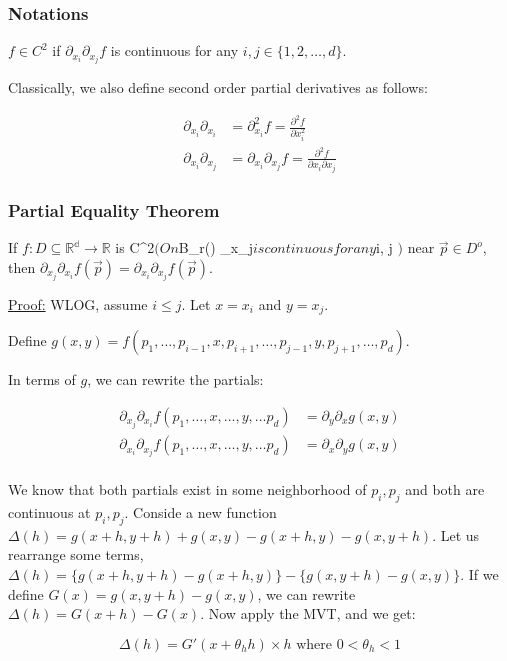 \documentclass[11 pt, twoside]{article}
\begin{document}
\subsubsection{Notations}
$f \in C^2$ if $\partial_{x_i}\partial_{x_j} f$ is continuous for any $i, j \in
\{1, 2, \dots, d\}$.

Classically, we also define second order partial derivatives as follows:

\begin{align*}
\partial_{x_i} \partial_{x_i} &= \partial_{x_i}^2 f = \frac{\partial^2 f}
{\partial x_i^2}\\
\partial_{x_i} \partial_{x_j} &= \partial_{x_i} \partial_{x_j} f =
\frac{\partial^2 f}{\partial x_i \partial x_j}
\end{align*}

\subsubsection{Partial Equality Theorem}
If $f:D \subseteq \mathbb{R^d} \to \mathbb{R}$ is C^2$ (On $B_r() \partial_{x_j}$ is continuous for any $i, j $)$ near $\vec{p} \in D^o$, then $\partial_{x_j}\partial_{x_i} f(\vec{p}) = \partial_{x_i}\partial_{x_j} f(\vec{p})$.

\underline{Proof:}
WLOG, assume $i \leq j$. Let $x = x_i$ and $y = x_j$.

Define $g(x, y) = f(p_1,
\dots, p_{i-1}, x, p_{i+1}, \dots, p_{j-1}, y, p_{j+1}, \dots, p_d)$.

In terms of $g$, we
can rewrite the partials:

\begin{align*}
\partial_{x_j}\partial_{x_i} f(p_1, \dots, x, \dots, y, \dots p_d) &= \partial_y
\partial_x g(x, y)\\
\partial_{x_i}\partial_{x_j} f(p_1, \dots, x, \dots, y, \dots p_d) &= \partial_x
\partial_y g(x, y)\\
\end{align*}

We know that both partials exist in some neighborhood of $p_i, p_j$ and both are
continuous at $p_i, p_j$.
Conside a
new function $\Delta(h) = g(x + h, y + h) + g(x, y) - g(x + h, y) - g(x, y +
h)$. Let us rearrange some terms, $\Delta(h) = \{g(x + h,
y + h) - g(x + h, y)\} - \{g(x, y + h) - g(x, y)\}$. If we define $G(x) = g(x,
y+h) - g(x, y)$, we can rewrite $\Delta(h) = G(x+h) - G(x)$. Now apply the MVT, and we get:

$$\Delta(h) = G'(x + \theta_h h) \times h \text{        where } 0 < \theta_h < 1$$
\end{document}
